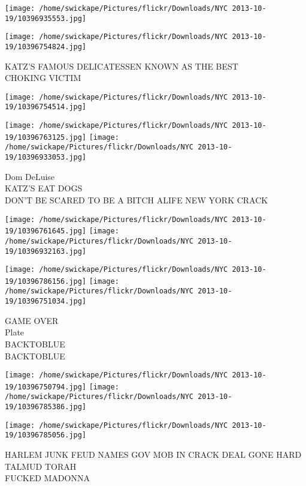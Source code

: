 \documentclass[10pt,letterpaper]{article}
\begin{document}
\texttt{[image: /home/swickape/Pictures/flickr/Downloads/NYC 2013-10-19/10396935553.jpg]}

\vspace{0.25in}
\texttt{[image: /home/swickape/Pictures/flickr/Downloads/NYC 2013-10-19/10396754824.jpg]}

KATZ'S FAMOUS DELICATESSEN KNOWN AS THE BEST\\
CHOKING VICTIM\\
\pagebreak

\texttt{[image: /home/swickape/Pictures/flickr/Downloads/NYC 2013-10-19/10396754514.jpg]}

\vspace{0.25in}
\texttt{[image: /home/swickape/Pictures/flickr/Downloads/NYC 2013-10-19/10396763125.jpg]}
\texttt{[image: /home/swickape/Pictures/flickr/Downloads/NYC 2013-10-19/10396933053.jpg]}

Dom DeLuise\\
KATZ'S EAT DOGS\\
DON'T BE SCARED TO BE A BITCH ALIFE NEW YORK CRACK\\
\pagebreak

\texttt{[image: /home/swickape/Pictures/flickr/Downloads/NYC 2013-10-19/10396761645.jpg]}
\texttt{[image: /home/swickape/Pictures/flickr/Downloads/NYC 2013-10-19/10396932163.jpg]}

\texttt{[image: /home/swickape/Pictures/flickr/Downloads/NYC 2013-10-19/10396786156.jpg]}
\texttt{[image: /home/swickape/Pictures/flickr/Downloads/NYC 2013-10-19/10396751034.jpg]}

GAME OVER\\
Plate\\
BACKTOBLUE\\
BACKTOBLUE\\
\pagebreak

\texttt{[image: /home/swickape/Pictures/flickr/Downloads/NYC 2013-10-19/10396750794.jpg]}
\texttt{[image: /home/swickape/Pictures/flickr/Downloads/NYC 2013-10-19/10396785386.jpg]}

\vspace{0.25in}
\texttt{[image: /home/swickape/Pictures/flickr/Downloads/NYC 2013-10-19/10396785056.jpg]}

HARLEM JUNK FEUD NAMES GOV MOB IN CRACK DEAL GONE HARD\\
TALMUD TORAH\\
FUCKED MADONNA\\
\pagebreak
\end{document}
